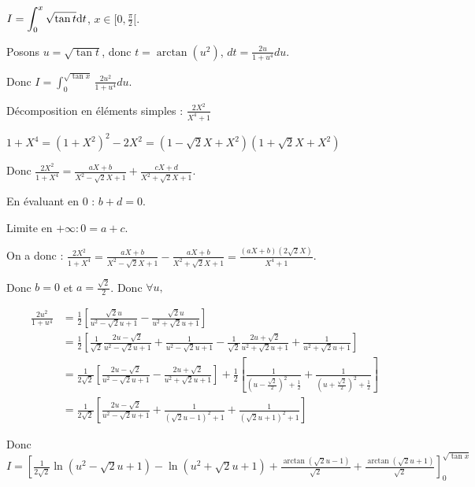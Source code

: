 \begin{exemple}
    $\displaystyle I = \int_0^x \sqrt{\tan t} \text d t$, $x \in [0, \frac \pi 2[$.

    Posons $u = \sqrt{\tan t}$, donc $t = \arctan(u^2)$, $dt = \frac{2u}{1 + u^4} du$.

    Donc $\displaystyle I = \int_0^{\sqrt{\tan x}} \frac{2u^2}{1 + u^4} du$.

    Décomposition en éléments simples : $\frac{2X^2}{X^4 + 1}$

    $1 + X^4 = (1 + X^2)^2 -2X^2 = (1 - \sqrt 2 X + X^2)(1 + \sqrt 2 X + X^2)$

    Donc $\displaystyle \frac{2X^2}{1 + X^4} = \frac{aX + b}{X^2 - \sqrt 2 X + 1} + \frac{cX + d}{X^2 + \sqrt 2 X + 1}$.

    En évaluant en 0 : $b + d = 0$.

    Limite en $+\infty : 0 = a + c$. 

    On a donc : $\displaystyle \frac{2X^2}{1 + X^4} = \frac{aX + b}{X^2 - \sqrt 2 X + 1} - \frac{aX + b}{X^2 + \sqrt 2 X + 1} = \frac{(aX + b)(2 \sqrt 2 X)}{X^4 + 1}$.

    Donc $b = 0$ et $a = \frac{\sqrt 2 }{2}$. Donc $\forall u, $

    \begin{align*}
        \frac{2 u^2}{1 + u^4} & = \frac 1 2 \left[\frac{\sqrt 2 u }{u^2 - \sqrt 2 u + 1} - \frac{\sqrt 2 u }{u^2 + \sqrt 2 u + 1}\right]\\
        & = \frac 1 2 \left[ \frac 1 {\sqrt 2} \frac{2u - \sqrt 2}{u^2 - \sqrt 2 u + 1} + \frac 1 {u^2 - \sqrt 2 u + 1} - \frac 1 {\sqrt 2} \frac{2u + \sqrt 2}{u^2 + \sqrt 2 u + 1} + \frac 1 {u^2 + \sqrt 2 u + 1} \right]\\
        & = \frac 1 {2 \sqrt 2} \left[ \frac{2u - \sqrt 2}{u^2 - \sqrt 2 u + 1} - \frac{2u + \sqrt 2}{u^2 + \sqrt 2 u + 1} \right] + \frac 1 2 \left[ \frac{1}{\left( u - \frac{\sqrt 2 }{2} \right)^2 + \frac 1 2} + \frac{1}{\left( u + \frac{\sqrt 2}{2} \right)^2 + \frac 1 2} \right]\\
        & = \frac 1 {2 \sqrt 2} \left[ \frac{2u - \sqrt 2}{u^2 - \sqrt 2 u + 1} + \frac 1 {(\sqrt 2 u - 1)^2 + 1} + \frac 1 {(\sqrt 2 u + 1)^2 + 1} \right]
    \end{align*}

    Donc $\displaystyle I = \left[ \frac{1 }{2 \sqrt 2 } \ln(u^2 - \sqrt 2 u + 1) - \ln(u^2 + \sqrt 2 u + 1) + \frac{\arctan(\sqrt 2 u - 1)}{\sqrt 2} + \frac{\arctan(\sqrt 2 u + 1)}{\sqrt 2} \right]_0^{\sqrt{\tan x}}$
\end{exemple}

